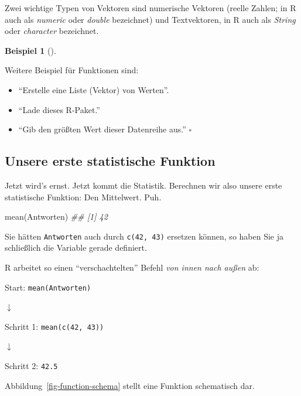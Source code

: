 \documentclass[
  letterpaper,
]{scrbook}
\newenvironment{Shaded}{\begin{snugshade}}{\end{snugshade}}
\newcommand{\DocumentationTok}[1]{\textcolor[rgb]{0.37,0.37,0.37}{\textit{#1}}}
\newcommand{\FunctionTok}[1]{\textcolor[rgb]{0.28,0.35,0.67}{#1}}
\newcommand{\NormalTok}[1]{\textcolor[rgb]{0.00,0.23,0.31}{#1}}
\providecommand{\tightlist}{%
  \setlength{\itemsep}{0pt}\setlength{\parskip}{0pt}}\usepackage{longtable,booktabs,array}
\theoremstyle{definition}
\newtheorem{example}{Beispiel}[chapter]
\theoremstyle{definition}
\theoremstyle{definition}
\theoremstyle{remark}
\begin{document}
Zwei wichtige Typen von Vektoren sind numerische Vektoren (reelle
Zahlen; in R auch als \emph{numeric} oder \emph{double} bezeichnet) und
Textvektoren, in R auch als \emph{String} oder \emph{character}
bezeichnet.

\begin{example}[]\protect\hypertarget{exm-funs}{}\label{exm-funs}

Weitere Beispiel für Funktionen sind:

\begin{itemize}
\tightlist
\item
  ``Erstelle eine Liste (Vektor) von Werten''.
\item
  ``Lade dieses R-Paket.''
\item
  ``Gib den größten Wert dieser Datenreihe aus.'' \(\square\)
\end{itemize}

\end{example}

\subsection{Unsere erste statistische Funktion}\label{sec-first-fun}

Jetzt wird's ernst. Jetzt kommt die Statistik. Berechnen wir also unsere
erste statistische Funktion: Den Mittelwert. Puh.

\begin{Shaded}
\begin{Highlighting}[]
\FunctionTok{mean}\NormalTok{(Antworten)}
\DocumentationTok{\#\# [1] 42}
\end{Highlighting}
\end{Shaded}

Sie hätten \texttt{Antworten} auch durch \texttt{c(42,\ 43)} ersetzen
können, so haben Sie ja schließlich die Variable gerade definiert.

R arbeitet so einen ``verschachtelten'' Befehl \emph{von innen nach
außen} ab:

Start: \texttt{mean(Antworten)}

{\(\downarrow\)}

Schritt 1: \texttt{mean(c(42,\ 43))}

{\(\downarrow\)}

Schritt 2: \texttt{42.5}

Abbildung~\ref{fig-function-schema} stellt eine Funktion schematisch
dar.
\end{document}
